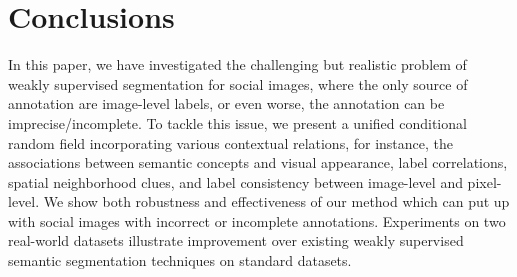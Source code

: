 \section{Conclusions}
In this paper, we have investigated the challenging but realistic problem of weakly supervised segmentation for social images, where the only source of annotation are image-level labels, or even worse, the annotation can be imprecise/incomplete. To tackle this issue, we present a unified conditional random field incorporating various contextual relations, for instance, the associations between semantic concepts and visual appearance, label correlations, spatial neighborhood clues, and label consistency between image-level and pixel-level. We show both robustness and effectiveness of our method which can put up with social images with incorrect or incomplete annotations. Experiments on two real-world datasets illustrate improvement over existing weakly supervised semantic segmentation techniques on standard datasets. 
